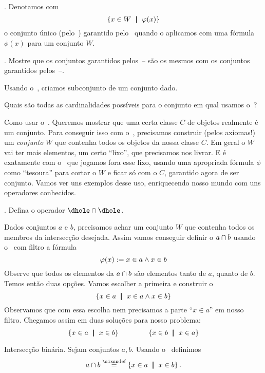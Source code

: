 {%
.
Denotamos com
$$
\left\{x \in W \ \;\mathord{\pmb{\mid}}\;\ \varphi(x)\right\}
$$
o conjunto único (pelo~) garantido pelo~ quando o aplicamos com uma fórmula $\phi(x)$ para um conjunto $W$.

\exercise.
\label{separation_yields_no_new_sets_yet}%
Mostre que os conjuntos garantidos pelos~--
são os mesmos com os conjuntos garantidos pelos~--.

\hint
Usando o~, criamos subconjunto de um conjunto dado.

\hint
Quais são todas as cardinalidades possíveis para o conjunto em qual
usamos o~?

\endexercise

\note Como usar o~.
Queremos mostrar que uma certa classe $C$ de objetos realmente é um conjunto.
Para conseguir isso com o~,
precisamos construir (pelos axiomas!) um \emph{conjunto}
$W$ que contenha todos os objetos da nossa classe $C$.
Em geral o $W$ vai ter mais elementos, um certo ``lixo'', que precisamos nos livrar.
E é exatamente com o~ que jogamos fora esse lixo,
usando uma apropriada fórmula $\phi$ como ``tesoura'' para cortar o $W$ e ficar só com o $C$,
garantido agora de ser conjunto.
Vamos ver uns exemplos desse uso,
enriquecendo nosso mundo com uns operadores conhecidos.

\example.
Defina o operador $\dhole\inters\dhole$.

\solution
Dados conjuntos $a$ e $b$,
precisamos achar um conjunto $W$ que contenha todos os membros
da intersecção desejada.  Assim vamos conseguir definir o $a \inters b$
usando o~ com filtro a fórmula
$$
\varphi(x)\mathrel{:=} {x \in a \land x \in b}
$$
Observe que todos os elementos da $a \inters b$ são elementos tanto de $a$,
quanto de $b$.
Temos então duas opções.  Vamos escolher a primeira e construir o
$$
\left\{x \in a \ \;\mathord{\pmb{\mid}}\;\ x \in a \land x \in b\right\}
$$
Observamos que com essa escolha nem precisamos a parte ``$x \in a$'' em nosso filtro.
Chegamos assim em duas soluções para nosso problema:
$$
\left\{x \in a \ \;\mathord{\pmb{\mid}}\;\ x \in b\right\}
\hskip 4em\relax
\left\{x \in b \ \;\mathord{\pmb{\mid}}\;\ x \in a\right\}
$$

\endexample

 Intersecção binária.
\label{inters_constructed}%
Sejam conjuntos $a,b$.
Usando o~ definimos
$$
a\inters b \defeq \setst {x\in a} {x\in b}.
$$

}
